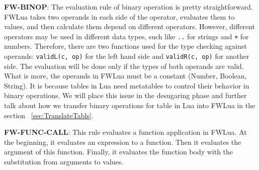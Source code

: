 {\bf FW-BINOP}: The evaluation rule of binary operation is pretty straightforward. FWLua takes two operands in each side of the operator, evaluates them to values, and then calculate them depend on different operators.
However, different operators may be used in different data types, such like {\tt ..} for strings and {\tt +} for numbers. Therefore, there are two functions used for the type checking against operands: {\tt validL(c, op)} for the left hand side and {\tt validR(c, op)} for another side. The evaluation will be done only if the types of both operands are valid.
What is more, the operands in FWLua must be a constant (Number, Boolean, String). It is because tables in Lua need metatables to control their behavior in binary operations. We will place this issue in the desugaring phase and further talk about how we transfer binary operations for table in Lua into FWLua in the section ~\ref{sec:TranslateTabls}.


{\bf FW-FUNC-CALL}: This rule evaluates a function application in FWLua. At the beginning, it evaluates an expression to a function. Then it evaluates the argument of this function.  Finally, it evaluates the function body with the substitution from arguments to values. 


